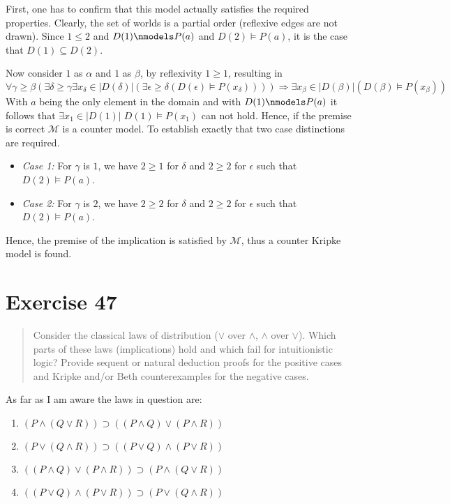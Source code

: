 \documentclass[11pt,a4paper]{article}
\newcommand{\lto}{\supset}
\newcommand{\sto}{\Rightarrow}
\begin{document}
First, one has to confirm that this model actually satisfies the required properties. Clearly, the set of worlds is a partial order (reflexive edges are not drawn).
Since $1 \leqslant 2$ and $D(1) \nmodels P(a)$ and  $D(2) \models P(a)$, it is the case that $D(1) \subseteq D(2)$. 

Now consider $1$ as $\alpha$  and $1$ as $\beta$, by reflexivity $1 \geqslant 1$, resulting in 
\begin{equation*}
\forall \gamma \geqslant \beta ( \exists \delta \geqslant \gamma  \exists x_{\delta} \in |D(\delta)| (\exists \epsilon \geqslant \delta ( D(\epsilon) \models P(x_{\delta})))) \sto \exists x_{\beta} \in |D( \beta)| (D(\beta) \models P(x_{\beta}) )
\end{equation*}
With $a$ being the only element in the domain and with $ D(1) \nmodels P(a)$ it follows that $ \exists x_{1} \in |D( 1)| \; D(1) \models P(x_1) $ can not hold. Hence, if the premise is correct $\mathcal{M}$ is a counter model. To establish exactly that two case distinctions are required.
\begin{itemize}
\item \emph{Case 1:} For $\gamma$ is $1$, we have $2 \geqslant 1$ for $\delta$ and $2 \geqslant 2$ for $\epsilon$ such that $D(2) \models P(a)$.
\item \emph{Case 2:} For $\gamma$ is $2$, we have $2 \geqslant 2$ for $\delta$ and $2 \geqslant 2$ for $\epsilon$ such that $D(2) \models P(a)$.
\end{itemize}
Hence, the premise of the implication is satisfied by $\mathcal{M}$, thus a counter Kripke model is found.

\section*{Exercise 47}
\begin{quote}
Consider the classical laws of distribution ($\lor$ over $\land$, $\land$ over $\lor$). Which parts of these laws (implications) hold and which fail
for intuitionistic logic?
Provide sequent or natural deduction proofs for the positive cases and Kripke and/or Beth counterexamples for the negative cases.
\end{quote}

As far as I am aware the laws in question are:
\begin{enumerate}
\item $(P\land (Q\lor R))\lto ((P\land Q)\lor (P\land R))$
\item $(P\lor (Q\land R))\lto ((P\lor Q)\land (P\lor R))$
\item $((P\land Q)\lor (P\land R)) \lto  (P\land (Q\lor R)) $
\item $((P\lor Q)\land (P\lor R)) \lto (P\lor (Q\land R)) $
\end{enumerate}
\end{document}
